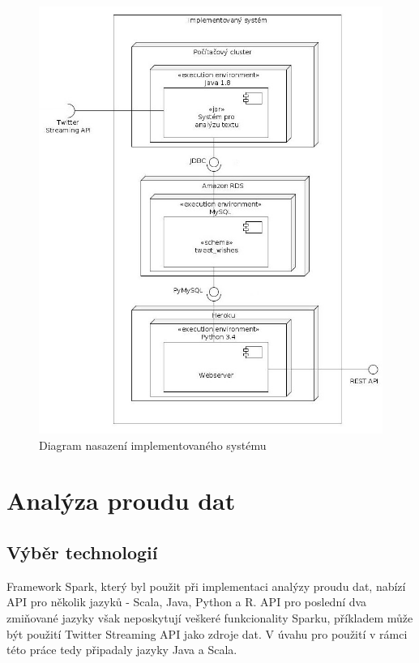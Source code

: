 \documentclass[thesis=B,czech]{FITthesis}[2012/06/26]
\begin{document}
\begin{figure}[h!]
   	\centering
   	\includegraphics[width=1\textwidth]{images/deployment.jpg}
   	\caption{Diagram nasazení implementovaného systému}
   	\label{fig:deployment_diagram}
\end{figure}

\section{Analýza proudu dat}
\label{analysis-implementation}
\subsection{Výběr technologií}
Framework Spark, který byl použit při implementaci analýzy proudu dat, nabízí API pro několik jazyků - Scala, Java, Python a R. API pro poslední dva zmiňované jazyky však neposkytují veškeré funkcionality Sparku, příkladem může být použití Twitter Streaming API jako zdroje dat. V úvahu pro použití v rámci této práce tedy připadaly jazyky Java a Scala. 
\end{document}
